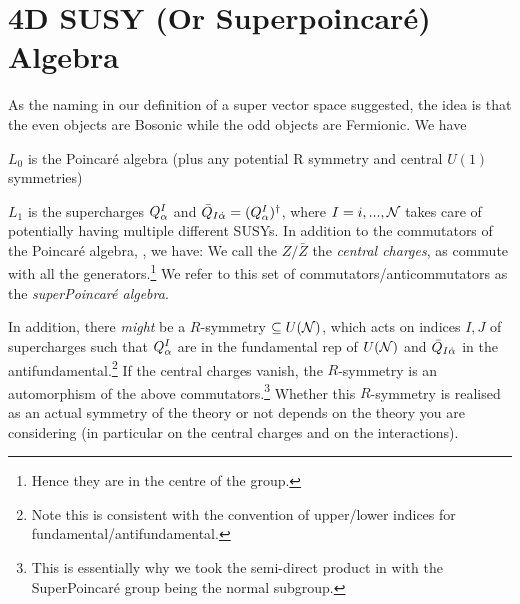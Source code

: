 \section{4D SUSY (Or Superpoincar\'{e}) Algebra}

As the naming in our definition of a super vector space suggested, the idea is that the even objects are Bosonic while the odd objects are Fermionic. We have 
\ben[label=(\roman*)]
    \item $L_0$ is the Poincar\'{e} algebra (plus any potential R symmetry and central $U(1)$ symmetries)
    \item $L_1$ is the supercharges $Q^I_{\alpha}$ and $\bar{Q}_{I\dot{\alpha}} = (Q_{\alpha}^I)^{\dagger}$, where $I= i,..., \mathcal{N}$ takes care of potentially having multiple different SUSYs.
\een
In addition to the commutators of the Poincar\'{e} algebra, , we have:
\noindent We call the $Z/\bar{Z}$ the \textit{central charges}, as commute with all the generators.\footnote{Hence they are in the centre of the group.} We refer to this set of commutators/anticommutators as the \textit{superPoincar\'{e} algebra}.

In addition, there \textit{might} be a $R$-symmetry $\subseteq U(\mathcal{N})$, which acts on indices $I,J$ of supercharges such that $Q_{\alpha}^I$ are in the fundamental rep of $U(\mathcal{N})$ and $\bar{Q}_{I\dot{\alpha}}$ in the antifundamental.\footnote{Note this is consistent with the convention of upper/lower indices for fundamental/antifundamental.} If the central charges vanish, the $R$-symmetry is an automorphism of the above commutators.\footnote{This is essentially why we took the semi-direct product in  with the SuperPoincar\'{e} group being the normal subgroup.} Whether this $R$-symmetry is realised as an actual symmetry of the theory or not depends on the theory you are considering (in particular on the central charges and on the interactions). 

